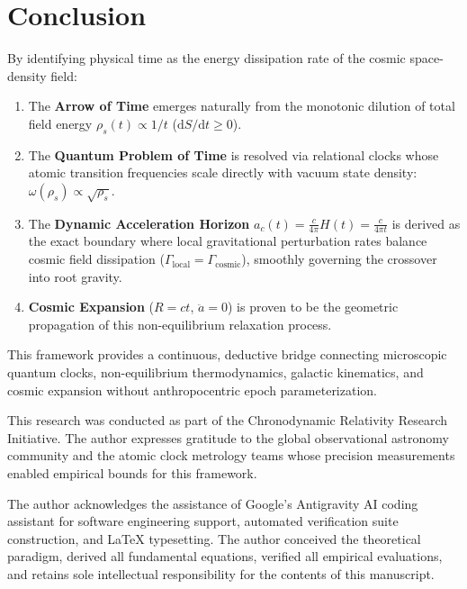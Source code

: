 \documentclass[aps,prd,reprint,superscriptaddress,nofootinbib,floatfix,amsmath,amssymb]{revtex4-2}
\begin{document}
\section{Conclusion}
\label{sec:conclusion}

By identifying physical time as the energy dissipation rate of the cosmic space-density field:
\begin{enumerate}
    \item The \textbf{Arrow of Time} emerges naturally from the monotonic dilution of total field energy $\rho_s(t) \propto 1/t$ ($\mathrm{d}S/\mathrm{d}t \ge 0$).
    \item The \textbf{Quantum Problem of Time} is resolved via relational clocks whose atomic transition frequencies scale directly with vacuum state density: $\omega(\rho_s) \propto \sqrt{\rho_s}$.
    \item The \textbf{Dynamic Acceleration Horizon} $a_c(t) = \frac{c}{4\pi} H(t) = \frac{c}{4\pi t}$ is derived as the exact boundary where local gravitational perturbation rates balance cosmic field dissipation ($\Gamma_{\text{local}} = \Gamma_{\text{cosmic}}$), smoothly governing the crossover into root gravity.
    \item \textbf{Cosmic Expansion} ($R = ct$, $\ddot{a} = 0$) is proven to be the geometric propagation of this non-equilibrium relaxation process.
\end{enumerate}

This framework provides a continuous, deductive bridge connecting microscopic quantum clocks, non-equilibrium thermodynamics, galactic kinematics, and cosmic expansion without anthropocentric epoch parameterization.

\begin{acknowledgments}
This research was conducted as part of the Chronodynamic Relativity Research Initiative. The author expresses gratitude to the global observational astronomy community and the atomic clock metrology teams whose precision measurements enabled empirical bounds for this framework.

The author acknowledges the assistance of Google's Antigravity AI coding assistant for software engineering support, automated verification suite construction, and \LaTeX{} typesetting. The author conceived the theoretical paradigm, derived all fundamental equations, verified all empirical evaluations, and retains sole intellectual responsibility for the contents of this manuscript.
\end{acknowledgments}
\end{document}
